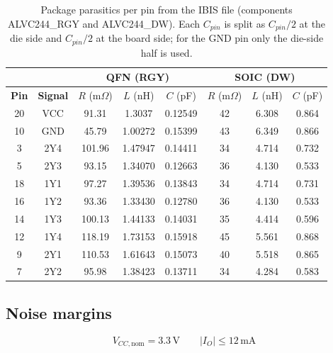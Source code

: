 \begin{table}[htbp]
    \centering
    \begin{tabular}{|c|c|c|c|c|c|c|c|}
        \hline
        & & \multicolumn{3}{c|}{\textbf{QFN (RGY)}} & \multicolumn{3}{c|}{\textbf{SOIC (DW)}} \\
        \hline
        \textbf{Pin} & \textbf{Signal} & $R$ (m$\Omega$) & $L$ (nH) & $C$ (pF) & $R$ (m$\Omega$) & $L$ (nH) & $C$ (pF) \\
        \hline
        20 & VCC & 91.31 & 1.3037 & 0.12549 & 42 & 6.308 & 0.864 \\
        10 & GND & 45.79 & 1.00272 & 0.15399 & 43 & 6.349 & 0.866 \\
        3 & 2Y4 & 101.96 & 1.47947 & 0.14411 & 34 & 4.714 & 0.732 \\
        5 & 2Y3 & 93.15 & 1.34070 & 0.12663 & 36 & 4.130 & 0.533 \\
        18 & 1Y1 & 97.27 & 1.39536 & 0.13843 & 34 & 4.714 & 0.731 \\
        16 & 1Y2 & 93.36 & 1.33430 & 0.12780 & 36 & 4.130 & 0.533 \\
        14 & 1Y3 & 100.13 & 1.44133 & 0.14031 & 35 & 4.414 & 0.596 \\
        12 & 1Y4 & 118.19 & 1.73153 & 0.15918 & 45 & 5.561 & 0.868 \\
        9 & 2Y1 & 110.53 & 1.61643 & 0.15073 & 40 & 5.518 & 0.865 \\
        7 & 2Y2 & 95.98 & 1.38423 & 0.13711 & 34 & 4.284 & 0.583 \\
        \hline
    \end{tabular}
    \caption{Package parasitics per pin from the IBIS file (components ALVC244\_RGY and ALVC244\_DW). Each $C_{pin}$ is split as $C_{pin}/2$ at the die side and $C_{pin}/2$ at the board side; for the GND pin only the die-side half is used.}
    \label{tab:sim_package}
\end{table}




\subsection{Noise margins} \label{subsec:noise-margins}

\[ V_{CC,\mathrm{nom}}=3.3\,\mathrm{V} \qquad |I_O| \leq 12\,\mathrm{mA} \]


